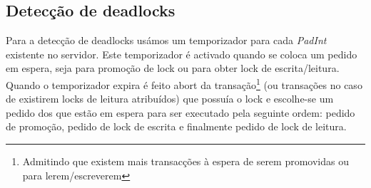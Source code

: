 \subsection{Detecção de deadlocks}

Para a detecção de deadlocks usámos um temporizador para cada \textit{PadInt} existente no servidor. Este temporizador é activado quando se coloca um pedido em espera, seja para promoção de lock ou para obter lock de escrita/leitura. Quando o temporizador expira é feito abort da transação\footnote{Admitindo que existem mais transacções à espera de serem promovidas ou para lerem/escreverem} (ou transações no caso de existirem locks de leitura atribuídos) que possuía o lock e escolhe-se um pedido dos que estão em espera para ser executado pela seguinte ordem: pedido de promoção, pedido de lock de escrita e finalmente pedido de lock de leitura.
